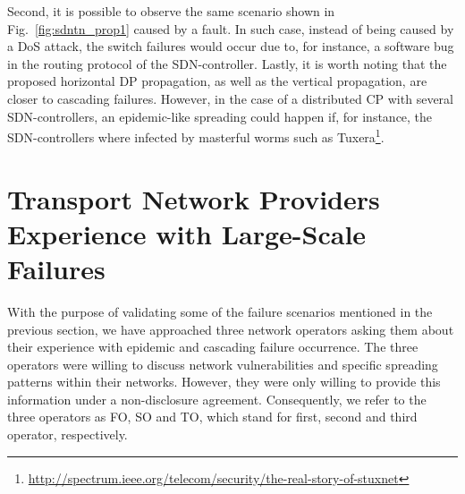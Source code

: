 \documentclass[10pt,draftclsnofoot,onecolumn,journal]{IEEEtran}
\begin{document}
Second, it is possible to observe the same scenario shown in Fig.~\ref{fig:sdntn_prop1} caused by a fault. In such case, instead of being caused by a DoS attack, the switch failures would occur due to, for instance, a software bug in the routing protocol of the SDN-controller. Lastly, it is worth noting that the proposed horizontal DP propagation, as well as the vertical propagation, are closer to cascading failures. However, in the case of a distributed CP with several SDN-controllers, an epidemic-like spreading could happen if, for instance, the SDN-controllers where infected by masterful worms such as Tuxera\footnote{\url{http://spectrum.ieee.org/telecom/security/the-real-story-of-stuxnet}}.









\section{Transport Network Providers Experience with Large-Scale Failures\label{providers}}


With the purpose of validating some of the failure scenarios mentioned in the previous section, we have approached three network operators asking them about their experience with epidemic and cascading failure occurrence. The three operators were willing to discuss network vulnerabilities and specific spreading patterns within their networks. However, they were only willing to provide this information under a non-disclosure agreement. Consequently, we refer to the three operators as FO, SO and TO, which stand for first, second and third operator, respectively.
\end{document}
